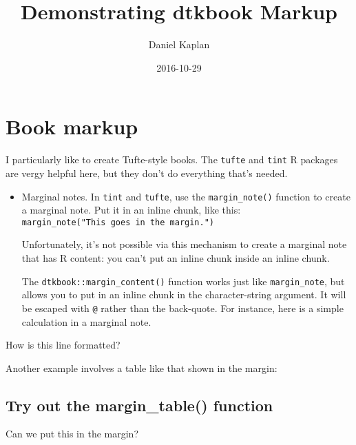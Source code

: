 \documentclass[]{tufte-handout}
\title{Demonstrating dtkbook Markup}
\author{Daniel Kaplan}
\date{2016-10-29}
\begin{document}
\maketitle




\section{Book markup}\label{book-markup}

I particularly like to create Tufte-style books. The \texttt{tufte} and
\texttt{tint} R packages are vergy helpful here, but they don't do
everything that's needed.

\begin{itemize}
\item
  Marginal notes. In \texttt{tint} and \texttt{tufte}, use the
  \texttt{margin\_note()} function to create a marginal note. Put it in
  an inline chunk, like this:
  \texttt{margin\_note("This\ goes\ in\ the\ margin.")}

  Unfortunately, it's not possible via this mechanism to create a
  marginal note that has R content: you can't put an inline chunk inside
  an inline chunk.

  The \texttt{dtkbook::margin\_content()} function works just like
  \texttt{margin\_note}, but allows you to put in an inline chunk in the
  character-string argument. It will be escaped with \texttt{@} rather
  than the back-quote. For instance, here is a simple calculation in a
  marginal note.
\end{itemize}

How is this line formatted?

Another example involves a table like that shown in the margin:

\subsection{Try out the margin\_table()
function}\label{try-out-the-margin_table-function}

Can we put this in the margin?
\end{document}
